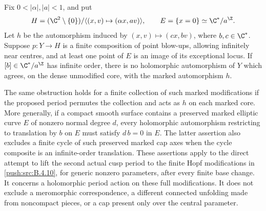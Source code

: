 \begin{proposition}\label{push:src:B.4.13}

Fix $0<|\alpha|,|a|<1$, and put
\[
 H=(\C^2\setminus\{0\})/
       \langle(x,v)\mapsto(\alpha x,av)\rangle,
       \qquad E=\{x=0\}\simeq\C^*/a^\Z.
\]
Let $h$ be the automorphism induced by
$(x,v)\mapsto(c x,bv)$, where $b,c\in\C^*$.
Suppose $p:Y\to H$ is a finite composition of point blow-ups,
allowing infinitely near centres, and at least one point of $E$
is an image of its exceptional locus. If $[b]\in\C^*/a^\Z$ has
infinite order, there is no holomorphic automorphism of $Y$
which agrees, on the dense unmodified core, with the marked
automorphism $h$.

The same obstruction holds for a finite collection of such marked
modifications if the proposed period permutes the collection and
acts as $h$ on each marked core.
More generally, if a compact smooth surface contains a preserved
marked elliptic curve $E$ of nonzero normal degree $d$, every
holomorphic automorphism restricting to translation by $b$ on $E$
must satisfy $d\,b=0$ in $E$.
The latter assertion also excludes a finite cycle of such preserved
marked cap axes when the cycle composite is an infinite-order
translation. These assertions apply to the direct attempt
to lift the second actual cusp period to the finite Hopf
modifications in \ref{push:src:B.4.10}, for generic nonzero parameters, after every
finite base change. It concerns a holomorphic period action on
these full modifications. It does not exclude a meromorphic
correspondence, a different connected unfolding made from
noncompact pieces, or a cap present only over the central parameter.
\end{proposition}


